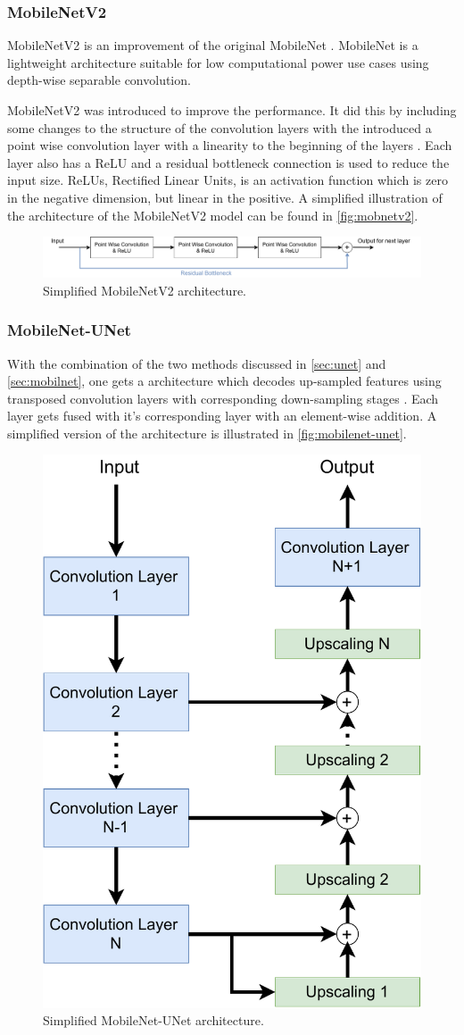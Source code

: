 \subsubsection{MobileNetV2}\label{sec:mobilnet}
MobileNetV2 is an improvement \cite{sandler2019mobilenetv2} of the original MobileNet \cite{howard2017mobilenets}. MobileNet is a lightweight architecture suitable for low computational power use cases using depth-wise separable convolution. 

MobileNetV2 was introduced to improve the performance. It did this by including some changes to the structure of the convolution layers with the introduced a point wise convolution layer with a linearity to the beginning of the layers \cite{vision_based}. Each layer also has a ReLU and a residual bottleneck connection is used to reduce the input size. ReLUs, Rectified Linear Units, is an  activation function which is zero in the negative dimension, but linear in the positive. A simplified illustration of the architecture of the MobileNetV2 model can be found in \autoref{fig:mobnetv2}.

\begin{figure}[H]
  \centering
  \includegraphics[width=1\textwidth]{img/ML/MobileNetV2.pdf}
  \caption{Simplified MobileNetV2 architecture. }
  \label{fig:mobnetv2}
\end{figure}

\subsubsection{MobileNet-UNet}\label{sec:mobilenet-unet}
With the combination of the two methods discussed in \autoref{sec:unet} and \autoref{sec:mobilnet}, one gets a architecture which decodes up-sampled features using transposed convolution layers with corresponding down-sampling stages \cite{8575250}. Each layer gets fused with it's corresponding layer with an element-wise addition. A simplified version of the architecture is illustrated in \autoref{fig:mobilenet-unet}. 

\begin{figure}[H]
  \centering
  \includegraphics[width=.4\textwidth]{img/ML/MobileNet-UNet.pdf}
  \caption{Simplified MobileNet-UNet architecture. }
  \label{fig:mobilenet-unet}
\end{figure}

